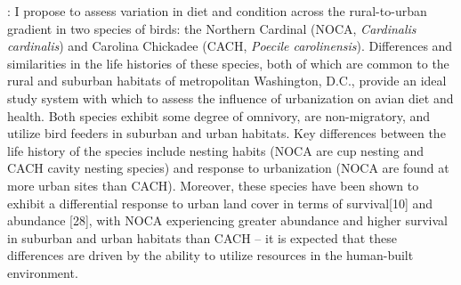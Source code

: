 \documentclass[12pt]{article}
\begin{document}

: I propose to assess variation in diet and condition across the rural-to-urban gradient in two species of birds: the Northern Cardinal (NOCA, \textit{Cardinalis cardinalis}) and Carolina Chickadee (CACH, \textit{Poecile carolinensis}). Differences and similarities in the life histories of these species, both of which are common to the rural and suburban habitats of metropolitan Washington, D.C., provide an ideal study system with which to assess the influence of urbanization on avian diet and health. Both species exhibit some degree of omnivory, are non-migratory, and utilize bird feeders in suburban and urban habitats. Key differences between the life history of the species include nesting habits (NOCA are cup nesting and CACH cavity nesting species) and response to urbanization (NOCA are found at more urban sites than CACH). Moreover, these species have been shown to exhibit a differential response to urban land cover in terms of survival[10] and abundance [28], with NOCA experiencing greater abundance and higher survival in suburban and urban habitats than CACH -- it is expected that these differences are driven by the ability to utilize resources in the human-built environment.

\end{document}
